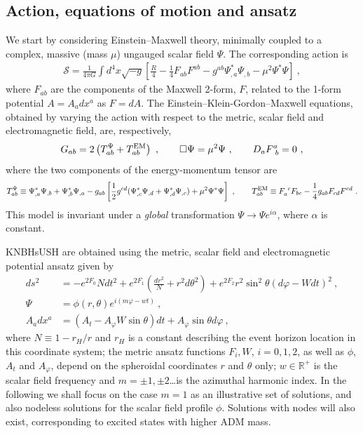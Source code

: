 \documentclass{article}
\begin{document}
\subsection{Action, equations of motion and ansatz}
\label{sec_mofrl}
We start by considering Einstein--Maxwell theory, minimally coupled to a complex, massive (mass $\mu$)  ungauged scalar field $\Psi$.  The corresponding action is
%
%
\begin{eqnarray}
  \label{action}
 \mathcal{S} = \frac{1}{4\pi G}\int d^4x \sqrt{-g}\left[\frac{R}{4}- \frac{1}{4}F_{ab}F^{ab}- g^{ab}\Psi^*_{,a}\Psi_{,b} -\mu^2\Psi^*\Psi \right]\ ,  
\end{eqnarray}  
where $F_{ab}$ are the components of the Maxwell 2-form, $F$, related to the 1-form potential $A=A_adx^a$ as $F=dA$. The Einstein--Klein-Gordon--Maxwell equations, obtained by varying the action with respect to the metric, scalar field and electromagnetic field, are, respectively,
%
%
\begin{equation}
G_{ab}  = 2\left( T_{ab}^\Psi+T_{ab} ^{\rm EM} \right)\ , \qquad \Box \Psi =\mu^2\Psi \ , \qquad D_aF^a_{~b}=0 \ ,
\label{eom}
\end{equation}
where the two components of the energy-momentum tensor are
%
\begin{equation}
\label{emt}
T_{ab}^\Psi \equiv  
 \Psi_{ , a}^*\Psi_{,b}
+\Psi_{,b}^*\Psi_{,a} 
-g_{ab}  \left[ \frac{1}{2} g^{cd} 
 ( \Psi_{,c}^*\Psi_{,d}+
\Psi_{,d}^*\Psi_{,c} )+\mu^2 \Psi^*\Psi\right] \ , \qquad
 T_{ab}^{\rm EM} \equiv F_a^{~c}F_{bc} - \frac{1}{4}g_{ab}F_{cd}F^{cd} \ .
\end{equation}
This model is invariant under a \textit{global} transformation $\Psi\rightarrow \Psi e^{i\alpha}$, where $\alpha$ is constant.



KNBHsUSH are obtained using the metric, scalar field and electromagnetic potential ansatz given by
%
\begin{align}
  \label{metric_ansatz}
  ds^2 &= -e^{2F_0}Ndt^2 + e^{2F_1}\left( \frac{dr^2}{N} + r^2d\theta^2 \right) + e^{2F_2}r^2\sin^2\theta \left(d\varphi - Wdt \right)^2 \ ,\\
\label{scalar_ansatz}
\Psi &= \phi(r,\theta)e^{i(m\varphi-w t)}~, \\
 \label{electric_ansatz}
 A_adx^a &= \left( A_t - A_\varphi W\sin\theta \right)dt + A_\varphi\sin\theta d\varphi \ ,
\end{align}
where $N\equiv 1-r_H/r$ and $r_H$ is a constant describing the event horizon location in this coordinate system; the metric ansatz functions $F_i,W$, $i=0,1,2$, as well as $\phi$, $A_t$ and $A_\varphi$, depend on the spheroidal coordinates $r$ and $\theta$ only; $w\in \mathbb{R}^+$ is the scalar field frequency and $m=\pm 1,\pm 2$\dots is the azimuthal harmonic index. In the following we shall focus on the case $m=1$ as an illustrative set of solutions, and also nodeless solutions for the scalar field profile $\phi$. Solutions with nodes will also exist, corresponding to excited states with higher ADM mass. 
\end{document}
